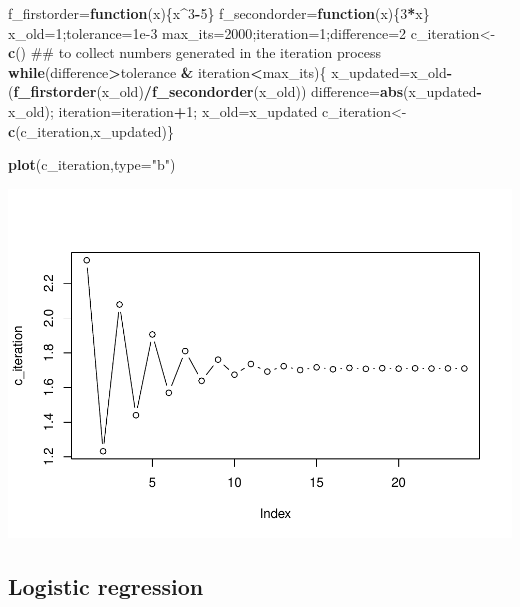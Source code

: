 \documentclass[]{book}
\newenvironment{Shaded}{\begin{snugshade}}{\end{snugshade}}
\newcommand{\KeywordTok}[1]{\textcolor[rgb]{0.13,0.29,0.53}{\textbf{#1}}}
\newcommand{\DataTypeTok}[1]{\textcolor[rgb]{0.13,0.29,0.53}{#1}}
\newcommand{\DecValTok}[1]{\textcolor[rgb]{0.00,0.00,0.81}{#1}}
\newcommand{\FloatTok}[1]{\textcolor[rgb]{0.00,0.00,0.81}{#1}}
\newcommand{\StringTok}[1]{\textcolor[rgb]{0.31,0.60,0.02}{#1}}
\newcommand{\ControlFlowTok}[1]{\textcolor[rgb]{0.13,0.29,0.53}{\textbf{#1}}}
\newcommand{\OperatorTok}[1]{\textcolor[rgb]{0.81,0.36,0.00}{\textbf{#1}}}
\newcommand{\NormalTok}[1]{#1}
\begin{document}
\begin{Shaded}
\begin{Highlighting}[]
\NormalTok{f_firstorder=}\ControlFlowTok{function}\NormalTok{(x)\{x}\OperatorTok{^}\DecValTok{3}\OperatorTok{-}\DecValTok{5}\NormalTok{\}}
\NormalTok{f_secondorder=}\ControlFlowTok{function}\NormalTok{(x)\{}\DecValTok{3}\OperatorTok{*}\NormalTok{x\}}
\NormalTok{x_old=}\DecValTok{1}\NormalTok{;tolerance=}\FloatTok{1e-3}
\NormalTok{max_its=}\DecValTok{2000}\NormalTok{;iteration=}\DecValTok{1}\NormalTok{;difference=}\DecValTok{2}
\NormalTok{c_iteration<-}\KeywordTok{c}\NormalTok{() ## to collect numbers generated in the iteration process }
\ControlFlowTok{while}\NormalTok{(difference}\OperatorTok{>}\NormalTok{tolerance }\OperatorTok{&}\StringTok{ }\NormalTok{iteration}\OperatorTok{<}\NormalTok{max_its)\{}
\NormalTok{  x_updated=x_old}\OperatorTok{-}\NormalTok{(}\KeywordTok{f_firstorder}\NormalTok{(x_old)}\OperatorTok{/}\KeywordTok{f_secondorder}\NormalTok{(x_old))}
\NormalTok{  difference=}\KeywordTok{abs}\NormalTok{(x_updated}\OperatorTok{-}\NormalTok{x_old);}
\NormalTok{  iteration=iteration}\OperatorTok{+}\DecValTok{1}\NormalTok{;}
\NormalTok{  x_old=x_updated}
\NormalTok{  c_iteration<-}\KeywordTok{c}\NormalTok{(c_iteration,x_updated)\}}

\KeywordTok{plot}\NormalTok{(c_iteration,}\DataTypeTok{type=}\StringTok{"b"}\NormalTok{)}
\end{Highlighting}
\end{Shaded}

\includegraphics{bookdown-demo_files/figure-latex/unnamed-chunk-19-1.pdf}

\subsection{Logistic regression}\label{logistic-regression}
\end{document}
